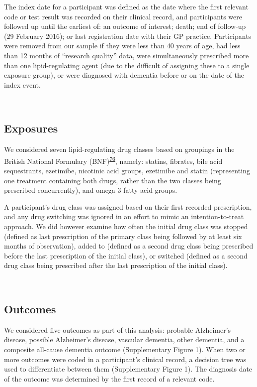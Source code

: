 \documentclass[a4paper, twoside]{templates/ociamthesis}
\begin{document}
The index date for a participant was defined as the date where the first relevant code or test result was recorded on their clinical record, and participants were followed up until the earliest of: an outcome of interest; death; end of follow-up (29 February 2016); or last registration date with their GP practice. Participants were removed from our sample if they were less than 40 years of age, had less than 12 months of ``research quality'' data, were simultaneously prescribed more than one lipid-regulating agent (due to the difficult of assigning these to a single exposure group), or were diagnosed with dementia before or on the date of the index event.

~

\hypertarget{exposures}{%
\subsection{Exposures}\label{exposures}}

We considered seven lipid-regulating drug classes based on groupings in the British National Formulary (BNF)\textsuperscript{\protect\hyperlink{ref-wishart2017}{76}}, namely: statins, fibrates, bile acid sequestrants, ezetimibe, nicotinic acid groups, ezetimibe and statin (representing one treatment containing both drugs, rather than the two classes being prescribed concurrently), and omega-3 fatty acid groups.

A participant's drug class was assigned based on their first recorded prescription, and any drug switching was ignored in an effort to mimic an intention-to-treat approach. We did however examine how often the initial drug class was stopped (defined as last prescription of the primary class being followed by at least six months of observation), added to (defined as a second drug class being prescribed before the last prescription of the initial class), or switched (defined as a second drug class being prescribed after the last prescription of the initial class).

~

\hypertarget{outcomes}{%
\subsection{Outcomes}\label{outcomes}}

We considered five outcomes as part of this analysis: probable Alzheimer's disease, possible Alzheimer's disease, vascular dementia, other dementia, and a composite all-cause dementia outcome (Supplementary Figure 1). When two or more outcomes were coded in a participant's clinical record, a decision tree was used to differentiate between them (Supplementary Figure 1). The diagnosis date of the outcome was determined by the first record of a relevant code.
\end{document}

